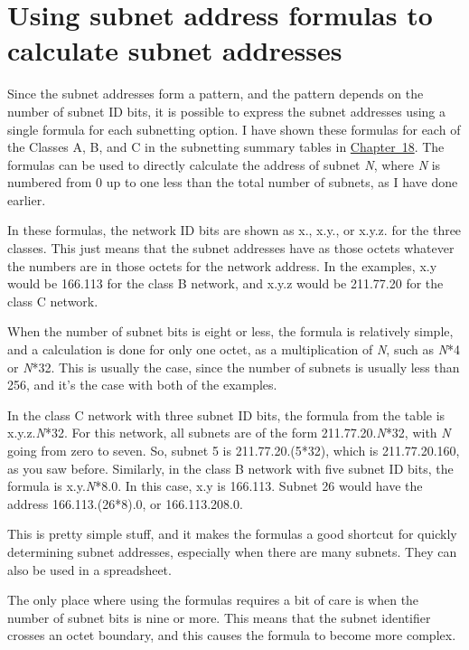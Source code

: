 \section{Using subnet address formulas to calculate subnet addresses}

 Since the
subnet addresses form a pattern, and the pattern depends on the number
of subnet ID bits, it is possible to express the subnet addresses using
a single formula for each subnetting option. I have shown these formulas
for each of the Classes A, B, and C in the subnetting summary tables in
\protect\hyperlink{ch18.html}{Chapter~18}. The formulas can be used to
directly calculate the address of subnet {\emph{N}}, where {\emph{N}} is
numbered from 0 up to one less than the total number of subnets, as I
have done earlier.

In these formulas, the network ID bits are shown as x., x.y., or x.y.z.
for the three classes. This just means that the subnet addresses have as
those octets whatever the numbers are in those octets for the network
address. In the examples, x.y would be 166.113 for the class B network,
and x.y.z would be 211.77.20 for the class C network.

When the number of subnet bits is eight or less, the formula is
relatively simple, and a calculation is done for only one octet, as a
multiplication of {\emph{N}}, such as {\emph{N}}*4 or {\emph{N}}*32.
This is usually the case, since the number of subnets is usually less
than 256, and it's the case with both of the examples.

In the class C network with three subnet ID bits, the formula from the
table is x.y.z.{\emph{N}}*32. For this network, all subnets are of the
form 211.77.20.{\emph{N}}*32, with {\emph{N}} going from zero to seven.
So, subnet 5 is 211.77.20.(5*32), which is 211.77.20.160, as you saw
before. Similarly, in the class B network with five subnet ID bits, the
formula is x.y.{\emph{N}}*8.0. In this case, x.y is 166.113. Subnet 26
would have the address 166.113.(26*8).0, or 166.113.208.0.

This is pretty simple stuff, and it makes the formulas a good shortcut
for quickly determining subnet addresses, especially when there are many
subnets. They can also be used in a spreadsheet.

The only place where using the formulas requires a bit of care is when
the number of subnet bits is nine or more. This means that the subnet
identifier crosses an octet boundary, and this causes the formula to
become more complex.

